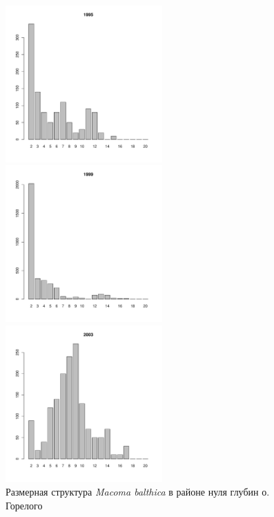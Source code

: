 \begin{figure}[hp]
	\begin{minipage}[b]{.3\linewidth}
	\begin{center}
	\includegraphics[width=60mm]{../White_Sea/Luvenga_Goreliy/low2_1995_.pdf}
	\end{center}
	\end{minipage}
	\hfill
	\begin{minipage}[b]{.3\linewidth}
	\begin{center}
	\includegraphics[width=60mm]{../White_Sea/Luvenga_Goreliy/low2_1999_.pdf}
	\end{center}
	\end{minipage}
	\hfill
	\begin{minipage}[b]{.3\linewidth}
	\begin{center}
	\includegraphics[width=60mm]{../White_Sea/Luvenga_Goreliy/low2_2003_.pdf}
	\end{center}
	\end{minipage}
\caption{Размерная структура {\it Macoma balthica} в районе нуля глубин о. Горелого}
\label{ris:size_str_Goreliy_low}
\end{figure}

